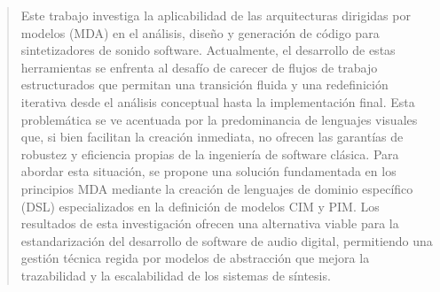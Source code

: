 \begin{abstract}
    Este trabajo investiga la aplicabilidad de las arquitecturas dirigidas por modelos (MDA) en el análisis, diseño y generación de código para sintetizadores de sonido software. Actualmente, el desarrollo de estas herramientas se enfrenta al desafío de carecer de flujos de trabajo estructurados que permitan una transición fluida y una redefinición iterativa desde el análisis conceptual hasta la implementación final. Esta problemática se ve acentuada por la predominancia de lenguajes visuales que, si bien facilitan la creación inmediata, no ofrecen las garantías de robustez y eficiencia propias de la ingeniería de software clásica. Para abordar esta situación, se propone una solución fundamentada en los principios MDA mediante la creación de lenguajes de dominio específico (DSL) especializados en la definición de modelos CIM y PIM. Los resultados de esta investigación ofrecen una alternativa viable para la estandarización del desarrollo de software de audio digital, permitiendo una gestión técnica regida por modelos de abstracción que mejora la trazabilidad y la escalabilidad de los sistemas de síntesis.
\end{abstract}
